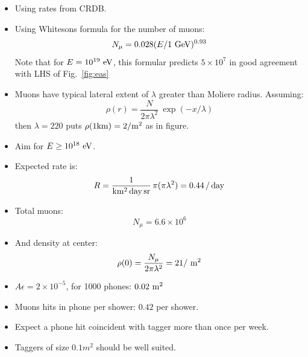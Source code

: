 \documentclass[12pt]{article}
\begin{document}
\begin{itemize}
 \item Using rates from CRDB.
 \item Using Whitesons formula for the number of muons:
$$N_{\mu} = 0.028 (E / 1~{\rm GeV})^{0.93}$$ Note that for $E=10^{19}~\rm
   eV$, this formular predicts $5\times10^7$ in good agreement with
   LHS of Fig.~\ref{fig:eas}
 \item Muons have typical lateral extent of $\lambda$ greater than Moliere radius.  Assuming:
$$\rho(r) = \frac{N}{2\pi\lambda^2} \ \exp(-x/\lambda)$$
then $\lambda=220$ puts $\rho(1 {\rm km}) = 2 / \rm m^2$ as in figure.

 \item Aim for $E \ge 10^{18}~\rm eV$.

 \item Expected rate is:
$$ R = \frac{1}{\rm km^2 \, day \, sr} \, \pi (\pi \lambda^2) = 0.44 \, / \, \rm day$$
 \item Total muons:
   $$N_\mu = 6.6 \times 10^6$$
 \item And density at center:
   $$\rho(0) = \frac{N_\mu}{2 \pi \lambda^2} = 21 /~\rm m^2$$
 \item $A\epsilon = 2\times 10^{-5}$, for 1000 phones:  $0.02~\rm m^2$
 \item Muons hits in phone per shower:  $0.42$ per shower.
 \item Expect a phone hit coincident with tagger more than once per week.
 \item Taggers of size $0.1 m^2$ should be well suited.
\end{itemize}
\end{document}
